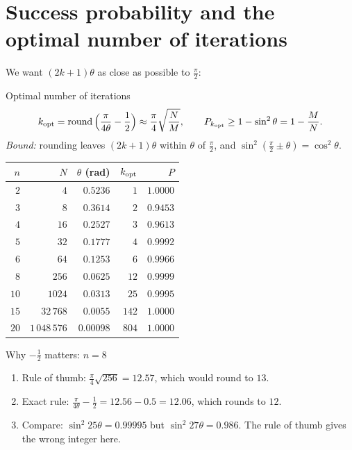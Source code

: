 \documentclass[11pt,a4paper,openany]{book}
\newcounter{wex}[section]
\newenvironment{steps}{\begin{enumerate}[label=\textbf{Step \arabic*.}, leftmargin=4.2em, itemsep=2pt]}{\end{enumerate}}
\newcommand{\kopt}{k_{\rm opt}}
\begin{document}
\section{Success probability and the optimal number of iterations}
We want $(2k+1)\theta$ as close as possible to $\frac\pi2$:
\begin{keyres}{Optimal number of iterations}
\[ \kopt = \operatorname{round}\Big(\frac{\pi}{4\theta} - \frac12\Big) \approx \frac\pi4\sqrt{\frac NM}, \qquad P_{\kopt} \ge 1 - \sin^2\theta = 1 - \frac MN. \]
\emph{Bound:} rounding leaves $(2k+1)\theta$ within $\theta$ of $\frac\pi2$, and $\sin^2(\frac\pi2 \pm \theta) = \cos^2\theta$.
\end{keyres}

\begin{center}
\renewcommand{\arraystretch}{1.15}
\begin{tabular}{@{}rrrrr@{}}
\toprule
$n$ & $N$ & $\theta$ (rad) & $\kopt$ & $P$\\ \midrule
$2$ & $4$ & $0.5236$ & $1$ & $1.0000$\\
$3$ & $8$ & $0.3614$ & $2$ & $0.9453$\\
$4$ & $16$ & $0.2527$ & $3$ & $0.9613$\\
$5$ & $32$ & $0.1777$ & $4$ & $0.9992$\\
$6$ & $64$ & $0.1253$ & $6$ & $0.9966$\\
$8$ & $256$ & $0.0625$ & $12$ & $0.9999$\\
$10$ & $1024$ & $0.0313$ & $25$ & $0.9995$\\
$15$ & $32\,768$ & $0.0055$ & $142$ & $1.0000$\\
$20$ & $1\,048\,576$ & $0.00098$ & $804$ & $1.0000$\\
\bottomrule
\end{tabular}
\end{center}

\begin{wexample}{Why $-\frac12$ matters: $n = 8$}
\begin{steps}
\item Rule of thumb: $\frac\pi4\sqrt{256} = 12.57$, which would round to $13$.
\item Exact rule: $\frac{\pi}{4\theta} - \frac12 = 12.56 - 0.5 = 12.06$, which rounds to $12$.
\item Compare: $\sin^2 25\theta = 0.99995$ but $\sin^2 27\theta = 0.986$. The rule of thumb gives the wrong integer here.
\end{steps}
\end{wexample}
\end{document}
